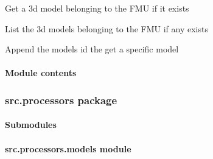 \documentclass[letterpaper,10pt,english]{sphinxmanual}
\begin{document}

\begin{fulllineitems}
\label{\detokenize{src.fmus:src.fmus.views.fmu_model}}
Get a 3d model belonging to the FMU if it exists

\end{fulllineitems}


\begin{fulllineitems}
\label{\detokenize{src.fmus:src.fmus.views.fmu_models}}
List the 3d models belonging to the FMU if any exists

Append the models id the get a specific model

\end{fulllineitems}



\paragraph{Module contents}
\label{\detokenize{src.fmus:module-src.fmus}}\label{\detokenize{src.fmus:module-contents}}

\subsubsection{src.processors package}
\label{\detokenize{src.processors:src-processors-package}}\label{\detokenize{src.processors::doc}}

\paragraph{Submodules}
\label{\detokenize{src.processors:submodules}}

\paragraph{src.processors.models module}
\label{\detokenize{src.processors:module-src.processors.models}}\label{\detokenize{src.processors:src-processors-models-module}}
\end{document}
